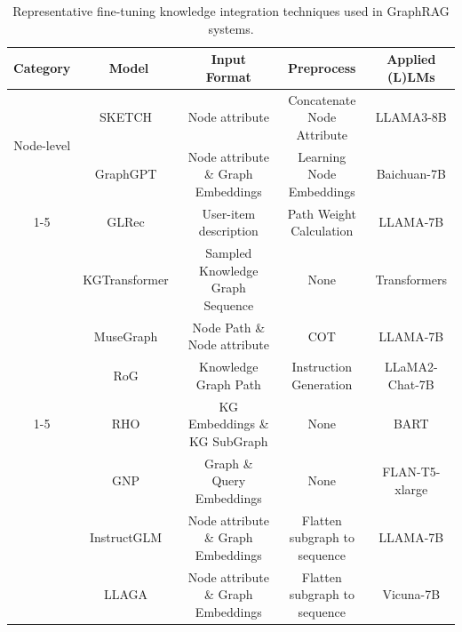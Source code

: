 \documentclass[lettersize,journal]{IEEEtran}
\begin{document}
\begin{table}[t]
\centering
	\caption{Representative fine-tuning knowledge integration techniques used in GraphRAG systems.}
     \vspace{-2mm}
	\label{tab:integration}
	\begin{tabular}{ccccc}

		\toprule
		 Category & Model   & Input Format & Preprocess & Applied (L)LMs \\\hline                                         
\multirow{2}{*}{Node-level}  &
SKETCH~\cite{anonymous2024large}   & Node attribute & Concatenate Node Attribute &  LLAMA3-8B \\

& GraphGPT~\cite{tang2023graphgpt}  & Node attribute \& Graph Embeddings  & Learning Node Embeddings & Baichuan-7B   \\
\cmidrule(lr){1-5}
\multirow{4}{*}{Path-level}  
 &GLRec~\cite{wu2024exploring}   &  User-item description & Path Weight Calculation & LLAMA-7B  \\
 &KGTransformer~\cite{zhang2023structure}   &  Sampled Knowledge Graph Sequence & None & Transformers   \\ 

&MuseGraph~\cite{tan2024musegraph}   &  Node Path \& Node attribute & COT & LLAMA-7B \\  
 &RoG~\cite{luo2024reasoning}   &  Knowledge Graph Path & Instruction Generation & LLaMA2-Chat-7B \\  
\cmidrule(lr){1-5}
\multirow{4}{*}{Subgraph-level} &RHO~\cite{ji2023rho}   & KG Embeddings \& KG SubGraph  & None &  BART \\
&GNP~\cite{tian2024graph}  &  Graph \& Query Embeddings   & None  &  FLAN-T5-xlarge \\
&InstructGLM~\cite{ye2024language}   &  Node attribute \& Graph Embeddings  & Flatten subgraph to sequence &  LLAMA-7B \\
&LLAGA~\cite{chen2024llaga}  &  Node attribute \& Graph Embeddings  & Flatten subgraph to sequence  &  Vicuna-7B \\
	\bottomrule
	\end{tabular}
     \vspace{-5mm}
\end{table}
\end{document}

